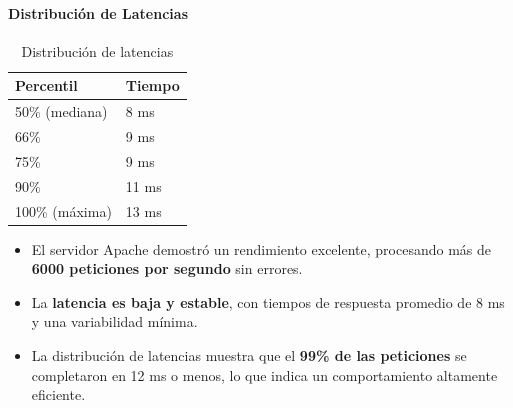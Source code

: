 \paragraph{Distribución de Latencias}

\begin{table}[H]
\centering
\begin{tabular}{|l|l|}
\hline
\textbf{Percentil} & \textbf{Tiempo} \\ \hline
50\% (mediana) & 8 ms \\ \hline
66\% & 9 ms \\ \hline
75\% & 9 ms \\ \hline
90\% & 11 ms \\ \hline
100\% (máxima) & 13 ms \\ \hline
\end{tabular}
\caption{Distribución de latencias}
\end{table}


\begin{itemize}
    \item El servidor Apache demostró un rendimiento excelente, procesando más de \textbf{6000 peticiones por segundo} sin errores.
    \item La \textbf{latencia es baja y estable}, con tiempos de respuesta promedio de 8 ms y una variabilidad mínima.
    \item La distribución de latencias muestra que el \textbf{99\% de las peticiones} se completaron en 12 ms o menos, lo que indica un comportamiento altamente eficiente.
\end{itemize}




